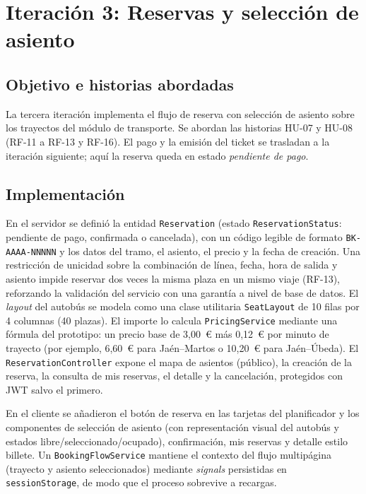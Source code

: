 \section{Iteración 3: Reservas y selección de asiento}
\label{sec:iteracion-3}

\subsection{Objetivo e historias abordadas}

La tercera iteración implementa el flujo de reserva con selección de asiento sobre los trayectos del módulo de transporte. Se abordan las historias HU-07 y HU-08 (RF-11 a RF-13 y RF-16). El pago y la emisión del ticket se trasladan a la iteración siguiente; aquí la reserva queda en estado \textit{pendiente de pago}.

\subsection{Implementación}

En el servidor se definió la entidad \texttt{Reservation} (estado \texttt{ReservationStatus}: pendiente de pago, confirmada o cancelada), con un código legible de formato \texttt{BK-AAAA-NNNNN} y los datos del tramo, el asiento, el precio y la fecha de creación. Una restricción de unicidad sobre la combinación de línea, fecha, hora de salida y asiento impide reservar dos veces la misma plaza en un mismo viaje (RF-13), reforzando la validación del servicio con una garantía a nivel de base de datos. El \textit{layout} del autobús se modela como una clase utilitaria \texttt{SeatLayout} de 10 filas por 4 columnas (40 plazas). El importe lo calcula \texttt{PricingService} mediante una fórmula del prototipo: un precio base de 3,00~\euro{} más 0,12~\euro{} por minuto de trayecto (por ejemplo, 6,60~\euro{} para Jaén--Martos o 10,20~\euro{} para Jaén--Úbeda). El \texttt{ReservationController} expone el mapa de asientos (público), la creación de la reserva, la consulta de \og mis reservas\fg{}, el detalle y la cancelación, protegidos con JWT salvo el primero.

En el cliente se añadieron el botón de reserva en las tarjetas del planificador y los componentes de selección de asiento (con representación visual del autobús y estados libre/seleccionado/ocupado), confirmación, \og mis reservas\fg{} y detalle estilo billete. Un \texttt{BookingFlowService} mantiene el contexto del flujo multipágina (trayecto y asiento seleccionados) mediante \textit{signals} persistidas en \texttt{sessionStorage}, de modo que el proceso sobrevive a recargas.

